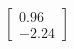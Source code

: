 \documentclass[preview]{standalone}
\begin{document}
\begin{align*}
\begin{bmatrix} 0.96 \\ -2.24 \end{bmatrix}
\end{align*}
\end{document}
